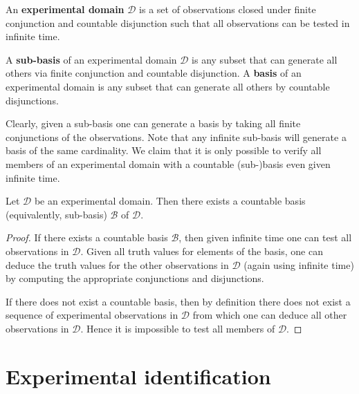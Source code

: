 \documentclass[11pt,letterpaper,fleqn]{memoir} %
\begin{document}
\begin{mathSection}

\begin{defn}
	An \textbf{experimental domain} $\mathcal{D}$ is a set of observations closed under finite conjunction and countable disjunction such that all observations can be tested in infinite time. 
\end{defn}

\begin{defn}
	A \textbf{sub-basis} of an experimental domain $\mathcal{D}$ is any subset that can generate all others via finite conjunction and countable disjunction. A \textbf{basis} of an experimental domain is any subset that can generate all others by countable disjunctions. 
\end{defn}

Clearly, given a sub-basis one can generate a basis by taking all finite conjunctions of the observations. Note that any infinite sub-basis will generate a basis of the same cardinality. We claim that it is only possible to verify all members of an experimental domain with a countable (sub-)basis even given infinite time. 

\begin{prop}
Let $\mathcal{D}$ be an experimental domain. Then there exists a countable basis (equivalently, sub-basis) $\mathcal{B}$ of $\mathcal{D}$.
\end{prop}

\begin{proof}
If there exists a countable basis $\mathcal{B}$, then given infinite time one can test all observations in $\mathcal{D}$. Given all truth values for elements of the basis, one can deduce the truth values for the other observations in $\mathcal{D}$ (again using infinite time) by computing the appropriate conjunctions and disjunctions. 

If there does not exist a countable basis, then by definition there does not exist a sequence of experimental observations in $\mathcal{D}$ from which one can deduce all other observations in $\mathcal{D}$. Hence it is impossible to test all members of $\mathcal{D}$.
\end{proof}

\end{mathSection}

\section{Experimental identification}
\end{document}
